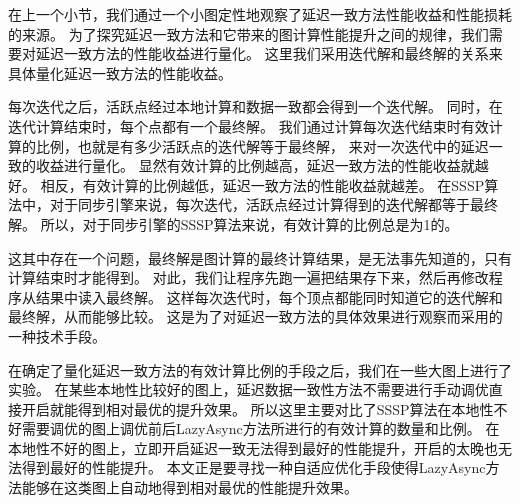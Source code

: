 在上一个小节，我们通过一个小图定性地观察了延迟一致方法性能收益和性能损耗的来源。
为了探究延迟一致方法和它带来的图计算性能提升之间的规律，我们需要对延迟一致方法的性能收益进行量化。
这里我们采用迭代解和最终解的关系来具体量化延迟一致方法的性能收益。

每次迭代之后，活跃点经过本地计算和数据一致都会得到一个迭代解。
同时，在迭代计算结束时，每个点都有一个最终解。
我们通过计算每次迭代结束时有效计算的比例，也就是有多少活跃点的迭代解等于最终解，
来对一次迭代中的延迟一致的收益进行量化。
显然有效计算的比例越高，延迟一致方法的性能收益就越好。
相反，有效计算的比例越低，延迟一致方法的性能收益就越差。
在SSSP算法中，对于同步引擎来说，每次迭代，活跃点经过计算得到的迭代解都等于最终解。
所以，对于同步引擎的SSSP算法来说，有效计算的比例总是为1的。


这其中存在一个问题，最终解是图计算的最终计算结果，是无法事先知道的，只有计算结束时才能得到。
对此，我们让程序先跑一遍把结果存下来，然后再修改程序从结果中读入最终解。
这样每次迭代时，每个顶点都能同时知道它的迭代解和最终解，从而能够比较。
这是为了对延迟一致方法的具体效果进行观察而采用的一种技术手段。



在确定了量化延迟一致方法的有效计算比例的手段之后，我们在一些大图上进行了实验。
在某些本地性比较好的图上，延迟数据一致性方法不需要进行手动调优直接开启就能得到相对最优的提升效果。
所以这里主要对比了SSSP算法在本地性不好需要调优的图上调优前后LazyAsync方法所进行的有效计算的数量和比例。
在本地性不好的图上，立即开启延迟一致无法得到最好的性能提升，开启的太晚也无法得到最好的性能提升。
本文正是要寻找一种自适应优化手段使得LazyAsync方法能够在这类图上自动地得到相对最优的性能提升效果。


